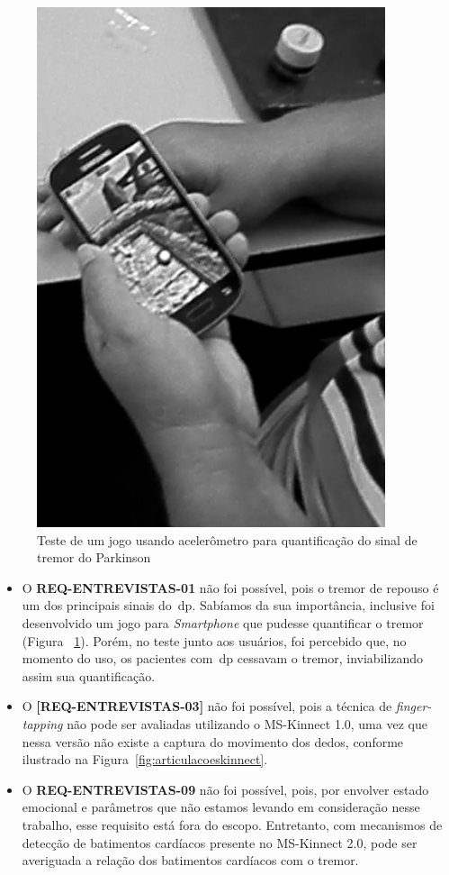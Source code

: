 	\begin{figure}[!ht]
	\centering
	\includegraphics[scale=0.5]{./img/gametremor.png}
	\caption{Teste de um jogo usando acelerômetro para quantificação do sinal de tremor do Parkinson}
	\label{fig:gametremor}
	\end{figure}

\begin{itemize}
	\item O \textbf{REQ-ENTREVISTAS-01} não foi possível, pois o tremor de repouso é um dos principais sinais do~\ac{dp}. Sabíamos da sua importância, inclusive foi desenvolvido um jogo para \textit{Smartphone} que pudesse quantificar o tremor (Figura ~\ref{fig:gametremor}). Porém, no teste junto aos usuários, foi percebido que, no momento do uso, os pacientes com~\ac{dp} cessavam o tremor, inviabilizando assim sua quantificação. 
	\item O \textbf{[REQ-ENTREVISTAS-03]} não foi possível, pois a técnica de \textit{finger-tapping} não pode ser avaliadas utilizando o MS-Kinnect 1.0, uma vez que nessa versão não existe a captura do movimento dos dedos, conforme ilustrado na Figura~\ref{fig:articulacoeskinnect}.
	\item O \textbf{REQ-ENTREVISTAS-09} não foi possível, pois, por envolver estado emocional e parâmetros que não estamos levando em consideração nesse trabalho, esse requisito está fora do escopo. Entretanto, com mecanismos de detecção de batimentos cardíacos presente no MS-Kinnect 2.0, pode ser averiguada a relação dos batimentos cardíacos com o tremor.
\end{itemize}




